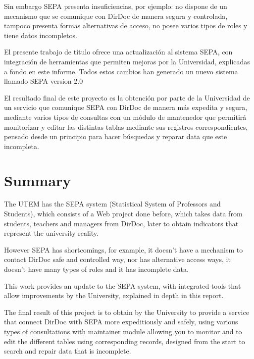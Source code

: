\documentclass[a4paper,12pt,openany,oneside]{book}
\begin{document}
Sin embargo SEPA presenta insuficiencias, por ejemplo: no dispone de un mecanismo que se comunique con DirDoc de manera segura y controlada, tampoco presenta formas alternativas de acceso, no posee varios tipos de roles y tiene datos incompletos.


El presente trabajo de título ofrece una actualización al sistema SEPA, con integración de herramientas que permiten mejoras por la Universidad, explicadas a fondo en este informe. Todos estos cambios han generado un nuevo sistema llamado SEPA version 2.0

El resultado final de este proyecto es la obtención por parte de la Universidad de un servicio que comunique SEPA con DirDoc de manera más expedita y segura, mediante varios tipos de consultas con un módulo de mantenedor que permitirá monitorizar y editar las distintas tablas mediante sus registros correspondientes, pensado desde un principio para hacer búsquedas y reparar data que este incompleta.

\chapter*{Summary}
\thispagestyle{empty}

The UTEM has the SEPA system (Statistical System of Professors and Students), which consists of a Web project done before, which takes data from students, teachers and managers from DirDoc, later to obtain indicators that represent the university reality.

However SEPA has shortcomings, for example, it doesn't have a mechanism to contact DirDoc safe and controlled way, nor has alternative access ways, it doesn't have many types of roles and it has incomplete data.

This work provides an update to the SEPA system, with integrated tools that allow improvements by the University, explained in depth in this report.

The final result of this project is to obtain by the University to provide a service that connect DirDoc with SEPA more expeditiously and safely, using various types of consultations with maintainer module allowing you to monitor and to edit the different tables using corresponding records, designed from the start to search and repair data that is incomplete.

\tableofcontents
\listoffigures
\listoftables
\thispagestyle{empty}
\end{document}
